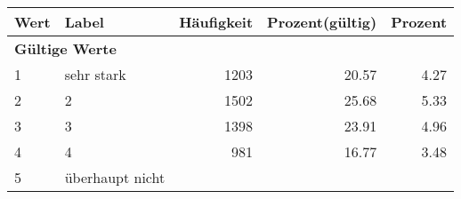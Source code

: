      \begin{longtable}{lXrrr}
     \toprule
     \textbf{Wert} & \textbf{Label} & \textbf{Häufigkeit} & \textbf{Prozent(gültig)} & \textbf{Prozent} \\
     \endhead
     \midrule
     \multicolumn{5}{l}{\textbf{Gültige Werte}}\\

     1 &
     \multicolumn{1}{X}{ sehr stark   } &


       \num{1203} &
       \num[round-mode=places,round-precision=2]{20.57} &
         \num[round-mode=places,round-precision=2]{4.27} \\

     2 &
     \multicolumn{1}{X}{ 2   } &


       \num{1502} &
       \num[round-mode=places,round-precision=2]{25.68} &
         \num[round-mode=places,round-precision=2]{5.33} \\

     3 &
     \multicolumn{1}{X}{ 3   } &


       \num{1398} &
       \num[round-mode=places,round-precision=2]{23.91} &
         \num[round-mode=places,round-precision=2]{4.96} \\

     4 &
     \multicolumn{1}{X}{ 4   } &


       \num{981} &
       \num[round-mode=places,round-precision=2]{16.77} &
         \num[round-mode=places,round-precision=2]{3.48} \\

     5 &
     \multicolumn{1}{X}{ überhaupt nicht   } &



\end{longtable}
